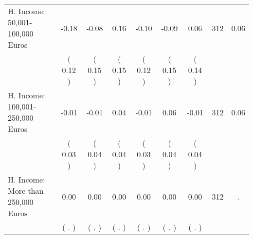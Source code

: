 \begin{tabular}{lcccccccc}
H. Income: 50,001-100,000 Euros &     -0.18 &     -0.08 &      0.16 &     -0.10 &     -0.09 &      0.06 & 312 &       0.06 \\ 
 & (     0.12 ) & (     0.15 ) & (     0.15 ) & (     0.12 ) & (     0.15 ) & (     0.14 ) & \\
H. Income: 100,001-250,000 Euros &     -0.01 &     -0.01 &      0.04 &     -0.01 &      0.06 &     -0.01 & 312 &       0.06 \\ 
 & (     0.03 ) & (     0.04 ) & (     0.04 ) & (     0.03 ) & (     0.04 ) & (     0.04 ) & \\
H. Income: More than 250,000 Euros &      0.00 &      0.00 &      0.00 &      0.00 &      0.00 &      0.00 & 312 &          . \\ 
 & (        . ) & (        . ) & (        . ) & (        . ) & (        . ) & (        . ) & \\
\bottomrule
\end{tabular}
